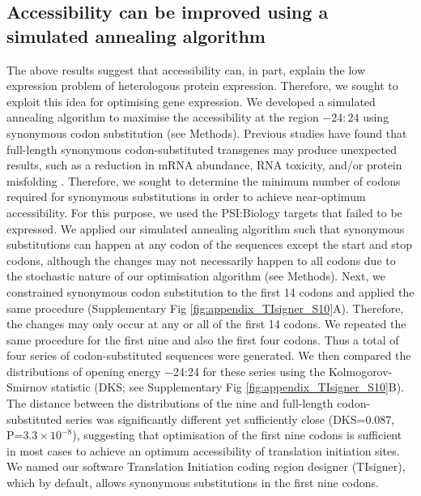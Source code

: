\subsection{Accessibility can be improved using a simulated annealing algorithm}
The above results suggest that accessibility can, in part, explain the low expression problem of heterologous protein expression. Therefore, we sought to exploit this idea for optimising gene expression. We developed a simulated annealing algorithm to maximise the accessibility at the region $−24:24$ using synonymous codon substitution (see Methods). Previous studies have found that full-length synonymous codon-substituted transgenes may produce unexpected results, such as a reduction in mRNA abundance, RNA toxicity, and/or protein misfolding \cite{Ben-Yehezkel2015-bj,Umu2016-zq,Tunney2018-sr,mittal2018codon}. Therefore, we sought to determine the minimum number of codons required for synonymous substitutions in order to achieve near-optimum accessibility. For this purpose, we used the PSI:Biology targets that failed to be expressed. We applied our simulated annealing algorithm such that synonymous substitutions can happen at any codon of the sequences except the start and stop codons, although the changes may not necessarily happen to all codons due to the stochastic nature of our optimisation algorithm (see Methods).  Next, we constrained synonymous codon substitution to the first 14 codons and applied the same procedure (Supplementary Fig \ref{fig:appendix_TIsigner_S10}A). Therefore, the changes may only occur at any or all of the first 14 codons. We repeated the same procedure for the first nine and also the first four codons. Thus a total of four series of codon-substituted sequences were generated. We then compared the distributions of opening energy −24:24 for these series using the Kolmogorov-Smirnov statistic (DKS; see Supplementary Fig \ref{fig:appendix_TIsigner_S10}B). The distance between the distributions of the nine and full-length codon-substituted series was significantly different yet sufficiently close (DKS=0.087, P=$3.3 \times 10^{-8}$), suggesting that optimisation of the first nine codons is sufficient in most cases to achieve an optimum accessibility of translation initiation sites. We named our software Translation Initiation coding region designer (TIsigner), which by default, allows synonymous substitutions in the first nine codons.

